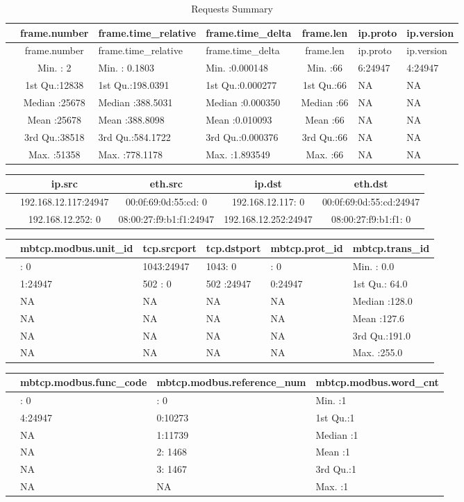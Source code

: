 \documentclass[11pt,]{article}
\begin{document}
\begin{longtable}[c]{@{}lcllcll@{}}
\caption{Requests Summary}\tabularnewline
\toprule
& frame.number & frame.time\_relative & frame.time\_delta & frame.len &
ip.proto & ip.version\tabularnewline
\midrule
\endfirsthead
\toprule
& frame.number & frame.time\_relative & frame.time\_delta & frame.len &
ip.proto & ip.version\tabularnewline
\midrule
\endhead
& Min. : 2 & Min. : 0.1803 & Min. :0.000148 & Min. :66 & 6:24947 &
4:24947\tabularnewline
& 1st Qu.:12838 & 1st Qu.:198.0391 & 1st Qu.:0.000277 & 1st Qu.:66 & NA
& NA\tabularnewline
& Median :25678 & Median :388.5031 & Median :0.000350 & Median :66 & NA
& NA\tabularnewline
& Mean :25678 & Mean :388.8098 & Mean :0.010093 & Mean :66 & NA &
NA\tabularnewline
& 3rd Qu.:38518 & 3rd Qu.:584.1722 & 3rd Qu.:0.000376 & 3rd Qu.:66 & NA
& NA\tabularnewline
& Max. :51358 & Max. :778.1178 & Max. :1.893549 & Max. :66 & NA &
NA\tabularnewline
\bottomrule
\end{longtable}

\begin{longtable}[c]{@{}lcccc@{}}
\toprule
& ip.src & eth.src & ip.dst & eth.dst\tabularnewline
\midrule
\endhead
& 192.168.12.117:24947 & 00:0f:69:0d:55:cd: 0 & 192.168.12.117: 0 &
00:0f:69:0d:55:cd:24947\tabularnewline
& 192.168.12.252: 0 & 08:00:27:f9:b1:f1:24947 & 192.168.12.252:24947 &
08:00:27:f9:b1:f1: 0\tabularnewline
\bottomrule
\end{longtable}

\begin{longtable}[c]{@{}llllll@{}}
\toprule
& mbtcp.modbus.unit\_id & tcp.srcport & tcp.dstport & mbtcp.prot\_id &
mbtcp.trans\_id\tabularnewline
\midrule
\endhead
& : 0 & 1043:24947 & 1043: 0 & : 0 & Min. : 0.0\tabularnewline
& 1:24947 & 502 : 0 & 502 :24947 & 0:24947 & 1st Qu.:
64.0\tabularnewline
& NA & NA & NA & NA & Median :128.0\tabularnewline
& NA & NA & NA & NA & Mean :127.6\tabularnewline
& NA & NA & NA & NA & 3rd Qu.:191.0\tabularnewline
& NA & NA & NA & NA & Max. :255.0\tabularnewline
\bottomrule
\end{longtable}

\begin{longtable}[c]{@{}llll@{}}
\toprule
& mbtcp.modbus.func\_code & mbtcp.modbus.reference\_num &
mbtcp.modbus.word\_cnt\tabularnewline
\midrule
\endhead
& : 0 & : 0 & Min. :1\tabularnewline
& 4:24947 & 0:10273 & 1st Qu.:1\tabularnewline
& NA & 1:11739 & Median :1\tabularnewline
& NA & 2: 1468 & Mean :1\tabularnewline
& NA & 3: 1467 & 3rd Qu.:1\tabularnewline
& NA & NA & Max. :1\tabularnewline
\bottomrule
\end{longtable}
\end{document}
